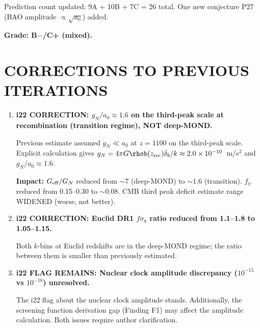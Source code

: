 \documentclass[11pt]{article}
\newcommand{\ee}[1]{\times 10^{#1}}
\newcommand{\Geff}{G_{\rm eff}}
\newcommand{\aM}{a_0}
\begin{document}
\begin{tcolorbox}[colback=blue!5!white, colframe=blue!70!black,
  title=\textbf{W4i23 TOP 5 FINDINGS (RANKED BY IMPACT)}]
\begin{enumerate}[label=\textbf{F\arabic*.}]
  Prediction count updated: 9A + 10B + 7C = 26 total.  One new
  conjecture P27 (BAO amplitude $\propto \sqrt{\aM}$) added.

  \textbf{Grade: B$-$/C+ (mixed).}

\end{enumerate}
\end{tcolorbox}

\section{CORRECTIONS TO PREVIOUS ITERATIONS}

\begin{tcolorbox}[colback=red!5!white, colframe=red!70!black,
  title=\textbf{CORRECTIONS}]

\begin{enumerate}

\item \textbf{i22 CORRECTION: $g_N/\aM \approx 1.6$ on the third-peak
  scale at recombination (transition regime), NOT deep-MOND.}

  Previous estimate assumed $g_N \ll \aM$ at $z = 1100$ on the
  third-peak scale.  Explicit calculation gives $g_N = 4\pi G\rhob(z_{\rm rec})
  \delta_b/k \approx 2.0\ee{-10}$~m/s$^2$ and $g_N/\aM \approx 1.6$.

  \textbf{Impact:}  $\Geff/G_N$ reduced from $\sim 7$ (deep-MOND)
  to $\sim 1.6$ (transition).  $f_\psi$ reduced from 0.15--0.30 to
  $\sim 0.08$.  CMB third peak deficit estimate range WIDENED (worse,
  not better).

\item \textbf{i22 CORRECTION: Euclid DR1 $f\sigma_8$ ratio reduced
  from 1.1--1.8 to 1.05--1.15.}

  Both $k$-bins at Euclid redshifts are in the deep-MOND regime;
  the ratio between them is smaller than previously estimated.

\item \textbf{i22 FLAG REMAINS: Nuclear clock amplitude discrepancy
  ($10^{-15}$ vs $10^{-18}$) unresolved.}

  The i22 flag about the nuclear clock amplitude stands.  Additionally,
  the screening function derivation gap (Finding F1) may affect the
  amplitude calculation.  Both issues require author clarification.

\end{enumerate}
\end{tcolorbox}
\end{document}
